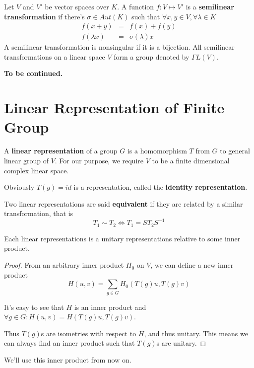 \documentclass[12pt]{book}
\begin{document}
\begin{definition}
	Let $V$ and $V'$ be vector spaces over $K$. A function $f:V\mapsto V'$ is a {\bf semilinear transformation} if there's $\sigma\in Aut(K)$ such that $\forall x,y\in V,\forall\lambda\in K$
	\begin{eqnarray}
		f(x+y)&=&f(x)+f(y)\\
		f(\lambda x)&=&\sigma(\lambda)x
	\end{eqnarray}
	A semilinear transformation is nonsingular if it is a bijection. All semilinear transformations on a linear space $V$ form a group denoted by $\Gamma L(V)$.
\end{definition}

{\color {red} \bf To be continued.}


	
	\chapter{Linear Representation of Finite Group}
	
	\begin{definition}
		
	A \textbf{linear representation} of a group $G$ is a homomorphism $T$ from $G$ to general linear group of $V$. For our purpose, we require $V$ to be  a finite dimensional complex linear space.
	\end{definition}
	
	\begin{example}
	Obviously $T(g)=id$ is a representation, called the \textbf{identity representation}.
	\end{example}

	
	\begin{definition}
	Two linear representations are said \textbf{equivalent} if they are related by a similar transformation, that is 
	\begin{equation}
		T_1\sim T_2\iff T_1=ST_2S^{-1}
	\end{equation}
	\end{definition}
	
	\begin{lemma}
		Each linear representations is a unitary representations relative to some inner product.
	\end{lemma}
	\begin{proof}
	From an arbitrary inner product $H_0$ on $V$, we can define a new inner product
	\begin{equation}
		H(u,v)=\sum_{g\in G}H_0(T(g)u,T(g)v)
	\end{equation}
	
	It's easy to see that $H$ is an inner product and $\forall g \in G: H(u,v)=H(T(g)u,T(g)v)$.
	
	Thus $T(g)$s are isometries with respect to $H$, and thus unitary. This means we can always find an inner product such that $T(g)$s are unitary. 
	\end{proof}
	We'll use this inner product from now on.
\end{document}
